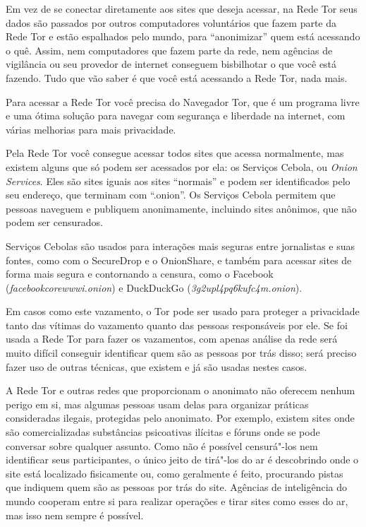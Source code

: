 Em vez de se conectar diretamente aos sites que deseja acessar, na
Rede Tor seus dados são passados por outros computadores voluntários que
fazem parte da Rede Tor e estão espalhados pelo mundo, para ``anonimizar''
quem está acessando o quê. Assim, nem computadores que fazem parte da
rede, nem agências de vigilância ou seu provedor de internet conseguem
bisbilhotar o que você está fazendo. Tudo que vão saber é que você está
acessando a Rede Tor, nada mais.

Para acessar a Rede Tor você precisa do
Navegador Tor, que é um programa
livre e uma ótima solução para navegar com segurança e liberdade na
internet, com várias melhorias para mais privacidade.

Pela Rede Tor você consegue acessar todos sites que acessa normalmente,
mas existem alguns que só podem ser acessados por ela: os Serviços
Cebola, ou \emph{Onion Services}. Eles são sites iguais aos sites ``normais'' e
podem ser identificados pelo seu endereço, que terminam com ``.onion''. Os
Serviços Cebola permitem que pessoas naveguem e publiquem anonimamente,
incluindo sites anônimos, que não podem ser censurados.

Serviços Cebolas são usados para interações mais seguras entre
jornalistas e suas fontes, como com o
SecureDrop e o
OnionShare, e também para acessar
sites de forma mais segura e contornando a censura, como o
Facebook (\emph{facebookcorewwwi.onion}) e DuckDuckGo
(\emph{3g2upl4pq6kufc4m.onion}).

Em casos como este vazamento, o Tor pode ser usado para proteger a
privacidade tanto das vítimas do vazamento quanto das pessoas
responsáveis por ele. Se foi usada a Rede Tor para fazer os vazamentos,
com apenas análise da rede será muito difícil conseguir identificar quem
são as pessoas por trás disso; será preciso fazer uso de outras
técnicas, que existem e já são usadas nestes casos.

A Rede Tor e outras redes que proporcionam o anonimato não oferecem
nenhum perigo em si, mas algumas pessoas usam delas para organizar
práticas consideradas ilegais, protegidas pelo anonimato. Por exemplo,
existem sites onde são comercializadas substâncias psicoativas ilícitas
e fóruns onde se pode conversar sobre qualquer assunto. Como não é possível
censurá"-los nem identificar seus participantes, o único jeito de
tirá"-los do ar é descobrindo onde o site está localizado fisicamente ou,
como geralmente é feito, procurando pistas que indiquem quem são as
pessoas por trás do site. Agências de inteligência do mundo cooperam
entre si para realizar operações e tirar sites como esses do ar, mas
isso nem sempre é possível.

